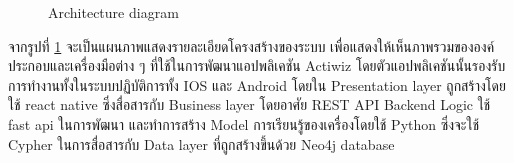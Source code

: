 \documentclass[14pt,oneside,openright,a4paper]{cpe-thai-project}
\begin{document}
  \begin{figure}[!h]\centering
    \setlength{\fboxrule}{0.5mm} %
    \setlength{\fboxsep}{0.5cm}
    \caption{Architecture diagram}\label{fig:ArchDia}
    \end{figure}

  จากรูปที่ \ref{fig:ArchDia} จะเป็นแผนภาพแสดงรายละเอียดโครงสร้างของระบบ เพื่อแสดงให้เห็นภาพรวมขององค์ประกอบและเครื่องมือต่าง ๆ ที่ใช้ในการพัฒนาแอปพลิเคชัน Actiwiz โดยตัวแอปพลิเคชันนั้นรองรับการทำงานทั้งในระบบปฏิบัติการทั้ง IOS และ Android โดยใน Presentation layer ถูกสร้างโดยใช้ react native ซึ่งสื่อสารกับ Business layer โดยอาศัย REST API Backend Logic ใช้ fast api ในการพัฒนา และทำการสร้าง Model การเรียนรู้ของเครื่องโดยใช้ Python ซึ่งจะใช้ Cypher ในการสื่อสารกับ Data layer ที่ถูกสร้างขึ้นด้วย Neo4j database
\newpage
\end{document}
